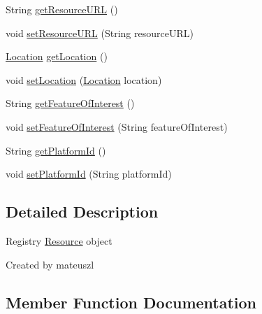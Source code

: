 \begin{DoxyCompactItemize}
\item 
String \hyperlink{classeu_1_1h2020_1_1symbiote_1_1model_1_1Resource_a4a0c05d9007f2216c55ddc32a44f467b}{get\+Resource\+U\+RL} ()
\item 
void \hyperlink{classeu_1_1h2020_1_1symbiote_1_1model_1_1Resource_a27d7401a8087bf902fd575039d574d0c}{set\+Resource\+U\+RL} (String resource\+U\+RL)
\item 
\hyperlink{classeu_1_1h2020_1_1symbiote_1_1model_1_1Location}{Location} \hyperlink{classeu_1_1h2020_1_1symbiote_1_1model_1_1Resource_acfb7ead093f1ed692640c99daba8fc6c}{get\+Location} ()
\item 
void \hyperlink{classeu_1_1h2020_1_1symbiote_1_1model_1_1Resource_a14eba3bd0171783f32d6d4446768905d}{set\+Location} (\hyperlink{classeu_1_1h2020_1_1symbiote_1_1model_1_1Location}{Location} location)
\item 
String \hyperlink{classeu_1_1h2020_1_1symbiote_1_1model_1_1Resource_a1e5912a2e60f0d2dcda674f26ebe871b}{get\+Feature\+Of\+Interest} ()
\item 
void \hyperlink{classeu_1_1h2020_1_1symbiote_1_1model_1_1Resource_abcfd5b3b2e1515ca7e9eb50eeb7ed0cf}{set\+Feature\+Of\+Interest} (String feature\+Of\+Interest)
\item 
String \hyperlink{classeu_1_1h2020_1_1symbiote_1_1model_1_1Resource_a97e847fb787ea9fe1d16d8bd702deece}{get\+Platform\+Id} ()
\item 
void \hyperlink{classeu_1_1h2020_1_1symbiote_1_1model_1_1Resource_a4f3c37b066d6e6587912fa1f1240048f}{set\+Platform\+Id} (String platform\+Id)
\end{DoxyCompactItemize}


\subsection{Detailed Description}
Registry \hyperlink{classeu_1_1h2020_1_1symbiote_1_1model_1_1Resource}{Resource} object

Created by mateuszl 

\subsection{Member Function Documentation}
